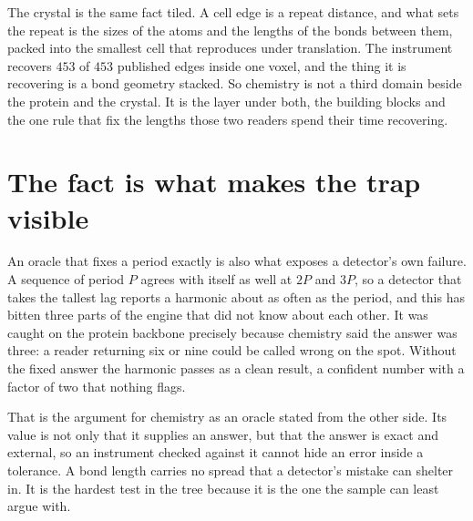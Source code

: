 The crystal is the same fact tiled. A cell edge is a repeat distance, and what sets the repeat is the
sizes of the atoms and the lengths of the bonds between them, packed into the smallest cell that
reproduces under translation. The instrument recovers $453$ of $453$ published edges inside one
voxel, and the thing it is recovering is a bond geometry stacked. So chemistry is not a third domain
beside the protein and the crystal. It is the layer under both, the building blocks and the one rule
that fix the lengths those two readers spend their time recovering.

\section{The fact is what makes the trap visible}

An oracle that fixes a period exactly is also what exposes a detector's own failure. A sequence of
period $P$ agrees with itself as well at $2P$ and $3P$, so a detector that takes the tallest lag
reports a harmonic about as often as the period, and this has bitten three parts of the engine that
did not know about each other. It was caught on the protein backbone precisely because chemistry
said the answer was three: a reader returning six or nine could be called wrong on the spot. Without
the fixed answer the harmonic passes as a clean result, a confident number with a factor of two that
nothing flags.

That is the argument for chemistry as an oracle stated from the other side. Its value is not only
that it supplies an answer, but that the answer is exact and external, so an instrument checked
against it cannot hide an error inside a tolerance. A bond length carries no spread that a detector's
mistake can shelter in. It is the hardest test in the tree because it is the one the sample can least
argue with.
